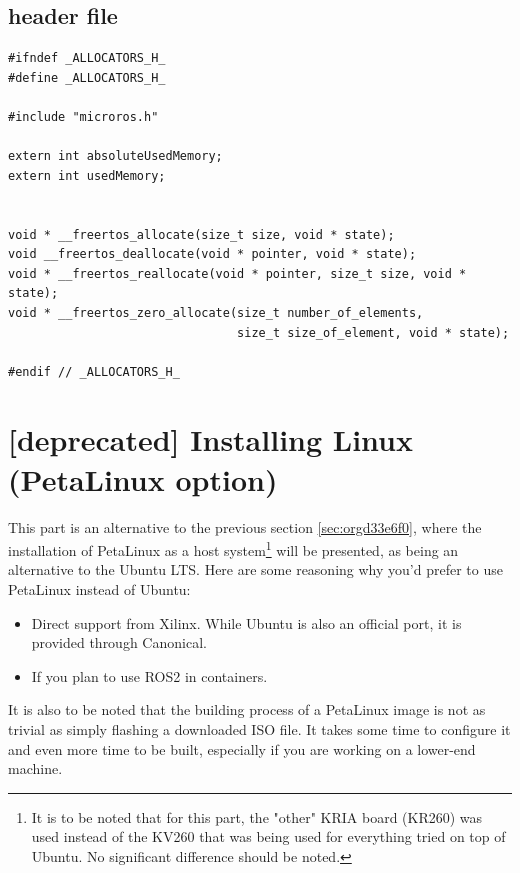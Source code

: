 \documentclass[10pt]{article}
\begin{document}
\subsection{header file}
\label{sec:org3b55e87}
\begin{verbatim}
#ifndef _ALLOCATORS_H_
#define _ALLOCATORS_H_

#include "microros.h"

extern int absoluteUsedMemory;
extern int usedMemory;


void * __freertos_allocate(size_t size, void * state);
void __freertos_deallocate(void * pointer, void * state);
void * __freertos_reallocate(void * pointer, size_t size, void * state);
void * __freertos_zero_allocate(size_t number_of_elements,
                                size_t size_of_element, void * state);

#endif // _ALLOCATORS_H_
\end{verbatim}
\section{[deprecated] Installing Linux (PetaLinux option)}
\label{sec:orgf905870}
This part is an alternative to the previous section \ref{sec:orgd33e6f0},
where the installation of PetaLinux as a host system\footnote{It is to be noted that for this part, the "other" KRIA board (KR260) was
used instead of the KV260 that was being used for everything tried on top of
Ubuntu. No significant difference should be noted.} will be presented,
as being an alternative to the Ubuntu LTS. Here are some reasoning why you'd
prefer to use PetaLinux instead of Ubuntu:
\begin{itemize}
\item Direct support from Xilinx. While Ubuntu is also an official port, it is
provided through Canonical.
\item If you plan to use ROS2 in containers.
\end{itemize}

It is also to be noted that the building process of a PetaLinux image is not as
trivial as simply flashing a downloaded ISO file. It takes some time to
configure it and even more time to be built, especially if you are working on a
lower-end machine.
\end{document}
